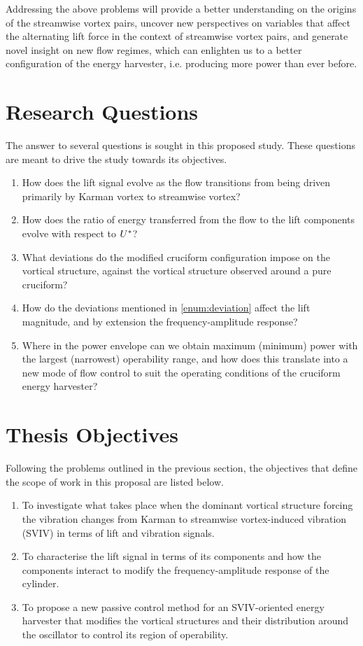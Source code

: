 \documentclass[oneside]{utmthesis}
\begin{document}
Addressing the above problems will provide a better understanding on the origins of the streamwise vortex pairs, uncover new perspectives on variables that affect the alternating lift force in the context of streamwise vortex pairs, and generate novel insight on new flow regimes, which can enlighten us to a better configuration of the energy harvester, i.e. producing more power than ever before.

\section{Research Questions}

The answer to several questions is sought in this proposed study. These questions are meant to drive the study towards its objectives.
\begin{enumerate}
  \item How does the lift signal evolve as the flow transitions from being driven primarily by Karman vortex to streamwise vortex?
  \item How does the ratio of energy transferred from the flow to the lift components evolve with respect to $U^{*}$?
  \item What deviations do the modified cruciform configuration impose on the vortical structure, against the vortical structure observed around a pure cruciform? \label{enum:deviation}
  \item How do the deviations mentioned in \ref{enum:deviation} affect the lift magnitude, and by extension the frequency-amplitude response?
  \item Where in the power envelope can we obtain maximum (minimum) power with the largest (narrowest) operability range, and how does this translate into a new mode of flow control to suit the operating conditions of the cruciform energy harvester?
\end{enumerate}

\section{Thesis Objectives}
Following the problems outlined in the previous section, the objectives that define the scope of work in this proposal are listed below.

\begin{enumerate}
  \item To investigate what takes place when the dominant vortical structure forcing the vibration changes from Karman to streamwise vortex-induced vibration (SVIV) in terms of lift and vibration signals. \label{enum:whatHappens}
  \item To characterise the lift signal in terms of its components and how the components interact to modify the frequency-amplitude response of the cylinder. \label{enum:characteriseLift}
  \item To propose a new passive control method for an SVIV-oriented energy harvester that modifies the vortical structures and their distribution around the oscillator to control its region of operability. \label{enum:passiveControl}
\end{enumerate}
\end{document}
